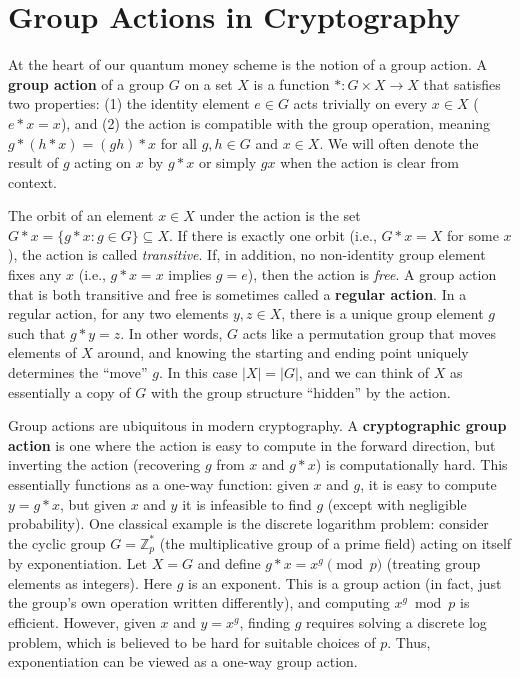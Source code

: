 \documentclass[11pt]{article}
\theoremstyle{definition}
\begin{document}
\section{Group Actions in Cryptography}
At the heart of our quantum money scheme is the notion of a group action. A \textbf{group action} of a group $G$ on a set $X$ is a function $*\colon G \times X \to X$ that satisfies two properties: (1) the identity element $e \in G$ acts trivially on every $x \in X$ ($e * x = x$), and (2) the action is compatible with the group operation, meaning $g*(h* x) = (gh)*x$ for all $g,h \in G$ and $x \in X$. We will often denote the result of $g$ acting on $x$ by $g*x$ or simply $g x$ when the action is clear from context.

The orbit of an element $x \in X$ under the action is the set $G * x = \{g*x : g \in G\} \subseteq X$. If there is exactly one orbit (i.e., $G * x = X$ for some $x$), the action is called \emph{transitive}. If, in addition, no non-identity group element fixes any $x$ (i.e., $g * x = x$ implies $g = e$), then the action is \emph{free}. A group action that is both transitive and free is sometimes called a \textbf{regular action}. In a regular action, for any two elements $y, z \in X$, there is a unique group element $g$ such that $g * y = z$. In other words, $G$ acts like a permutation group that moves elements of $X$ around, and knowing the starting and ending point uniquely determines the “move” $g$. In this case $|X| = |G|$, and we can think of $X$ as essentially a copy of $G$ with the group structure “hidden” by the action.

Group actions are ubiquitous in modern cryptography. A \textbf{cryptographic group action} is one where the action is easy to compute in the forward direction, but inverting the action (recovering $g$ from $x$ and $g*x$) is computationally hard. This essentially functions as a one-way function: given $x$ and $g$, it is easy to compute $y = g*x$, but given $x$ and $y$ it is infeasible to find $g$ (except with negligible probability). One classical example is the discrete logarithm problem: consider the cyclic group $G = \mathbb{Z}_p^*$ (the multiplicative group of a prime field) acting on itself by exponentiation. Let $X = G$ and define $g * x = x^g \pmod p$ (treating group elements as integers). Here $g$ is an exponent. This is a group action (in fact, just the group’s own operation written differently), and computing $x^g \bmod p$ is efficient. However, given $x$ and $y = x^g$, finding $g$ requires solving a discrete log problem, which is believed to be hard for suitable choices of $p$. Thus, exponentiation can be viewed as a one-way group action.
\end{document}
